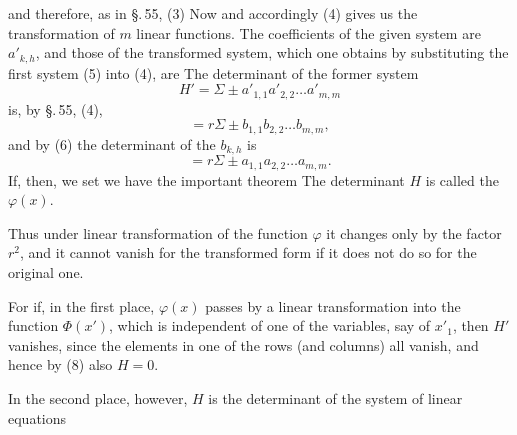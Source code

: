 and therefore, as in \S.\,55, (3)
Now
and accordingly (4) gives us the transformation of $m$ linear
functions. The coefficients of the given system are $a'_{k,h}$,
and those of the transformed system, which one obtains by substituting
the first system (5) into (4), are
The determinant of the former system
\[
H' = \Sigma \pm a'_{1,1} a'_{2,2} \ldots a'_{m,m}
\]
is, by \S.\,55, (4),
\[
= r \Sigma \pm b_{1,1} b_{2,2} \ldots b_{m,m},
\]
and by (6) the determinant of the $b_{k,h}$ is
\[
= r \Sigma \pm a_{1,1} a_{2,2} \ldots a_{m,m}.
\]
If, then, we set
we have the important theorem
The determinant $H$ is called the 
$\varphi(x)$.

Thus under linear transformation of the function $\varphi$ it
changes only by the factor $r^2$, and it cannot vanish for the
transformed form if it does not do so for the original one.


For if, in the first place, $\varphi(x)$ passes by a linear transformation
into the function $\Phi(x')$, which is independent of one of the variables,
say of $x'_1$, then $H'$ vanishes, since the elements
in one of the rows (and columns) all vanish, and hence
by (8) also $H = 0$.

In the second place, however, $H$ is the determinant of the system of linear
equations
